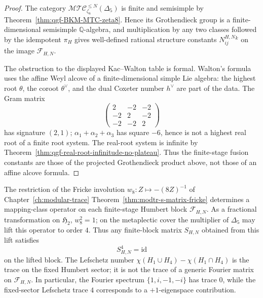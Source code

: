 \begin{proof}
The category \(\mathcal{MTC}_{\zeta_8}^{\leq N}(\Delta_5)\) is finite
and semisimple by Theorem~\ref{thm:qgf-BKM-MTC-zeta8}. Hence its
Grothendieck group is a finite-dimensional semisimple
\(\mathbb Q\)-algebra, and multiplication by any two classes followed
by the idempotent \(\pi_H\) gives well-defined rational structure
constants \(N^{H,N}_{ij}{}^k\) on the image \(\mathcal F_{H,N}\).

The obstruction to the displayed Kac--Walton table is formal. Walton's
formula uses the affine Weyl alcove of a finite-dimensional simple
Lie algebra: the highest root \(\theta\), the coroot
\(\theta^\vee\), and the dual Coxeter number \(h^\vee\) are part of the
data. The Gram matrix
\[
\begin{pmatrix}
2&-2&-2\\
-2&2&-2\\
-2&-2&2
\end{pmatrix}
\]
has signature \((2,1)\); \(\alpha_1+\alpha_2+\alpha_3\) has square
\(-6\), hence is not a highest real root of a finite root system.
The real-root system is infinite by
Theorem~\ref{thm:qgf-real-root-infinitude-no-plateau}. Thus the
finite-stage fusion constants are those of the projected
Grothendieck product above, not those of an affine alcove formula.
\end{proof}

\begin{theorem}
\label{thm:qgf-s-matrix-eigenvalues}
The restriction of the Fricke involution $w_8\colon Z\mapsto -(8Z)^{-1}$
of Chapter~\ref{ch:modular-trace}
Theorem~\ref{thm:modtr-s-matrix-fricke} determines a mapping-class
operator on each finite-stage Humbert block \(\mathcal F_{H,N}\).
As a fractional transformation on \(\mathfrak H_2\), \(w_8^2=1\);
on the metaplectic cover the multiplier of \(\Delta_5\) may lift this
operator to order \(4\). Thus any finite-block matrix \(S_{H,N}\)
obtained from this lift satisfies
\[
 S_{H,N}^4=\mathrm{id}
\]
on the lifted block. The Lefschetz number
\(\chi(H_1\cup H_4)-\chi(H_1\cap H_4)\) is the trace on the fixed
Humbert sector; it is not the trace of a generic Fourier matrix on
\(\mathcal F_{H,N}\). In particular, the Fourier spectrum
\(\{1,i,-1,-i\}\) has trace \(0\), while the fixed-sector Lefschetz
trace \(4\) corresponds to a \(+1\)-eigenspace contribution.
\end{theorem}

